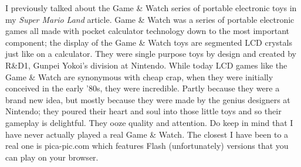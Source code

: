 \documentclass{book}
\begin{document}
I previously talked about the Game \& Watch series of portable electronic toys in my \emph{Super Mario Land} article. Game \& Watch was a series of portable electronic games all made with pocket calculator technology down to the most important component; the display of the Game \& Watch toys are segmented LCD crystals just like on a calculator. They were single purpose toys by design and created by R\&D1, Gunpei Yokoi’s division at Nintendo. While today LCD games like the Game \& Watch are synonymous with cheap crap, when they were initially conceived in the early ’80s, they were incredible. Partly because they were a brand new idea, but mostly because they were made by the genius designers at Nintendo; they poured their heart and soul into those little toys and so their gameplay is delightful. They ooze quality and attention. Do keep in mind that I have never actually played a real Game \& Watch. The closest I have been to a real one is pica-pic.com which features Flash (unfortunately) versions that you can play on your browser.\par
\FloatBarrier\vspace{\baselineskip}\begin{figure}[H]\end{figure}
\end{document}
